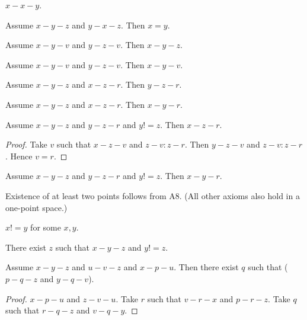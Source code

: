 \documentclass{article}
\begin{document}
  \begin{forthel}
    \begin{lemma}[L3_3]
      $x-x-y$.
    \end{lemma}

    \begin{lemma}[L3_4]
      Assume $x-y-z$ and $y-x-z$. Then $x = y$.
    \end{lemma}

    \begin{lemma}[L3_5a]
      Assume $x-y-v$ and $y-z-v$. Then $x-y-z$.
    \end{lemma}

    \begin{lemma}[L3_5b]
      Assume $x-y-v$ and $y-z-v$. Then $x-y-v$.
    \end{lemma}

    \begin{lemma}[L3_6a]
      Assume $x-y-z$ and $x-z-r$. Then $y-z-r$.
    \end{lemma}

    \begin{lemma}[L3_6b]
      Assume $x-y-z$ and $x-z-r$. Then $x-y-r$.
    \end{lemma}

    \begin{lemma}[L3_7a]
      Assume $x-y-z$ and $y-z-r$ and $y != z$. Then $x-z-r$.
    \end{lemma}
    \begin{proof}
    	Take $v$ such that $x-z-v$ and $z-v : z-r$.	Then $y-z-v$ and $z-v : z-r$. Hence $v = r$.
    \end{proof}

    \begin{lemma}[L3_7b]
      Assume $x-y-z$ and $y-z-r$ and $y != z$. Then $x-y-r$.
    \end{lemma}
  \end{forthel}

  Existence of at least two points follows from A8. (All other axioms also hold in a one-point space.)

  \begin{forthel}
    \begin{lemma}[L3_13]
      $x != y$ for some $x, y$.
    \end{lemma}

    \begin{lemma}[L3_14]
      There exist $z$ such that $x-y-z$ and $y != z$.
    \end{lemma}

    \begin{lemma}[L3_17]
      Assume $x-y-z$ and $u-v-z$ and $x-p-u$. Then there exist $q$ such that ($p-q-z$ and $y-q-v$).
    \end{lemma}
    \begin{proof}
      $x-p-u$ and $z-v-u$.
    	Take $r$ such that $v-r-x$ and $p-r-z$. %
    	Take $q$ such that $r-q-z$ and $v-q-y$. %
    \end{proof}
  \end{forthel}
\end{document}
